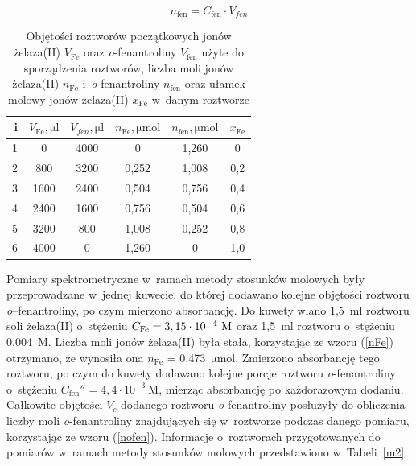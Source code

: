 \documentclass[12pt]{article}
\begin{document}
\begin{equation}
    n_{\mathrm{fen}} = C_{\mathrm{fen}} \cdot V_{fen}
    \label{nofen}
\end{equation}

\begin{table}[H]
    \caption{Objętości roztworów początkowych jonów żelaza(II) $V_{\mathrm{Fe}}$ oraz \textit{o}-fenantroliny $V_{\mathrm{fen}}$ użyte do sporządzenia roztworów, liczba moli jonów żelaza(II) $n_{\mathrm{Fe}}$ i~\textit{o}-fenantroliny $n_{\mathrm{fen}}$ oraz ułamek molowy jonów żelaza(II) $x_{\mathrm{Fe}}$ w~danym roztworze}
    \centering
\begin{tabular}{|r|ccccc|}
\hline
i & $V_{\mathrm{Fe}}, \mathrm{\mu l}$ & $V_{fen}, \mathrm{\mu l}$ & $n_{\mathrm{Fe}}, \mathrm{\mu mol}$ & $n_{\mathrm{fen}}, \mathrm{\mu mol}$ & $x_{\mathrm{Fe}}$ \\ \hline
1 & 0                        & 4000                        & 0                          & 1,260                         & 0        \\
2 & 800                      & 3200                        & 0,252                      & 1,008                         & 0,2      \\
3 & 1600                     & 2400                        & 0,504                      & 0,756                         & 0,4      \\
4 & 2400                     & 1600                        & 0,756                      & 0,504                         & 0,6      \\
5 & 3200                     & 800                         & 1,008                      & 0,252                         & 0,8      \\
6 & 4000                     & 0                           & 1,260                      & 0                             & 1,0      \\ \hline
\end{tabular}
    \label{m1}
\end{table}


Pomiary spektrometryczne w~ramach metody stosunków molowych były przeprowadzane w~jednej kuwecie, do której dodawano kolejne objętości roztworu \textit{o}--fenantroliny, po czym mierzono absorbancję. Do kuwety wlano 1,5~ml roztworu soli żelaza(II) o~stężeniu $C_{\ce{Fe}}= \mathrm{3,15 \cdot 10^{-4}~M}$ oraz 1,5~ml roztworu  o~stężeniu 0,004~M. Liczba moli jonów żelaza(II) była stała, korzystając ze wzoru (\ref{nFe}) otrzymano, że wynosiła ona $n_{\mathrm{Fe}}$ = 0,473~$\mathrm{\mu mol}$. Zmierzono absorbancję tego roztworu, po czym do kuwety dodawano kolejne porcje roztworu \textit{o}-fenantroliny o~stężeniu $C_{\mathrm{fen}}'' = \mathrm{4,4 \cdot 10^{-3}~M}$, mierząc absorbancję po każdorazowym dodaniu.  Całkowite objętości $V_c$ dodanego roztworu \textit{o}-fenantroliny posłużyły do obliczenia liczby moli \textit{o}-fenantroliny znajdujących się w~roztworze podczas danego pomiaru, korzystając ze wzoru (\ref{nofen}). Informacje o~roztworach przygotowanych do pomiarów w~ramach metody stosunków molowych przedstawiono w~Tabeli~\ref{m2}.
\end{document}
